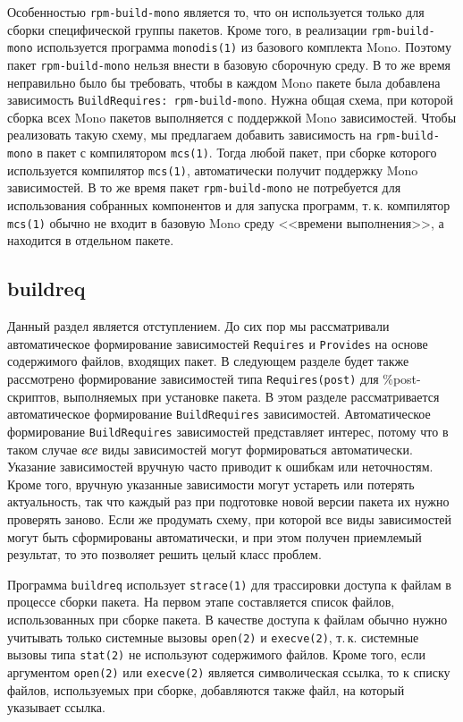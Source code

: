 \documentclass[russian,a4paper,12pt,titlepage]{article}
\begin{document}
Особенностью \verb|rpm-build-mono| является то, что он используется только для сборки специфической группы
пакетов.  Кроме того, в реализации \verb|rpm-build-mono| используется программа \verb|monodis(1)| из базового
комплекта Mono.  Поэтому пакет \verb|rpm-build-mono| нельзя внести в базовую сборочную среду.  В то же время
неправильно было бы требовать, чтобы в каждом Mono пакете была добавлена зависимость \texttt{BuildRequires: rpm-build-mono}.
Нужна общая схема, при которой сборка всех Mono пакетов выполняется с поддержкой Mono зависимостей.
Чтобы реализовать такую схему, мы предлагаем добавить зависимость на \verb|rpm-build-mono| в пакет
с компилятором \verb|mcs(1)|.  Тогда любой пакет, при сборке которого используется компилятор \verb|mcs(1)|,
автоматически получит поддержку Mono зависимостей.  В то же время пакет \verb|rpm-build-mono| не потребуется
для использования собранных компонентов и для запуска программ, т.\,к. компилятор \verb|mcs(1)| обычно
не входит в базовую Mono среду <<времени выполнения>>, а находится в отдельном пакете.

\subsection{buildreq}
Данный раздел является отступлением.  До сих пор мы рассматривали автоматическое формирование
зависимостей \verb|Requires| и \verb|Provides| на основе содержимого файлов, входящих пакет.
В следующем разделе будет также рассмотрено формирование зависимостей типа \verb|Requires(post)|
для \%post-скриптов, выполняемых при установке пакета.  В этом разделе рассматривается автоматическое
формирование \verb|BuildRequires| зависимостей.  Автоматическое формирование \verb|BuildRequires|
зависимостей представляет интерес, потому что в таком случае \emph{все} виды зависимостей могут
формироваться автоматически.  Указание зависимостей вручную часто приводит к ошибкам или неточностям.
Кроме того, вручную указанные зависимости могут устареть или потерять актуальность, так что каждый
раз при подготовке новой версии пакета их нужно проверять заново.  Если же продумать схему, при которой
все виды зависимостей могут быть сформированы автоматически, и при этом получен приемлемый результат,
то это позволяет решить целый класс проблем.

Программа \verb|buildreq| использует \verb|strace(1)| для трассировки доступа к файлам в процессе сборки пакета.
На первом этапе составляется список файлов, использованных при сборке пакета.
В качестве доступа к файлам обычно нужно учитывать только системные вызовы \verb|open(2)| и \verb|execve(2)|,
т.\,к. системные вызовы типа \verb|stat(2)| не используют содержимого файлов.  Кроме того, если аргументом
\verb|open(2)| или \verb|execve(2)| является символическая ссылка, то к списку файлов, используемых при сборке,
добавляются также файл, на который указывает ссылка.
\end{document}
